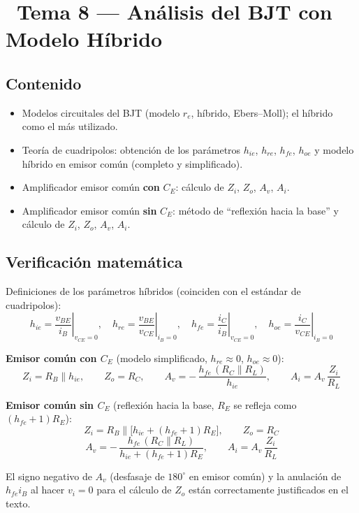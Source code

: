 \documentclass[11pt,a4paper]{article}
\newcommand{\iconotexto}[2]{\textcolor{cyanNeon}{\faIcon{#1}}~#2}
\begin{document}
\section{\iconotexto{project-diagram}{Tema 8 --- Análisis del BJT con Modelo Híbrido}}

\subsection{Contenido}
\begin{itemize}[leftmargin=1.4em]
  \item Modelos circuitales del BJT (modelo $r_e$, híbrido, Ebers--Moll); el híbrido como el más utilizado.
  \item Teoría de cuadripolos: obtención de los parámetros $h_{ie}$, $h_{re}$, $h_{fe}$, $h_{oe}$ y modelo híbrido en emisor común (completo y simplificado).
  \item Amplificador emisor común \textbf{con} $C_E$: cálculo de $Z_i$, $Z_o$, $A_v$, $A_i$.
  \item Amplificador emisor común \textbf{sin} $C_E$: método de ``reflexión hacia la base'' y cálculo de $Z_i$, $Z_o$, $A_v$, $A_i$.
\end{itemize}

\subsection{Verificación matemática}

\begin{tcolorbox}[cajaFortaleza, title={\faIcon{check-circle}~Fórmulas verificadas --- todas correctas}]
Definiciones de los parámetros híbridos (coinciden con el estándar de cuadripolos):
\[
h_{ie} = \left.\frac{v_{BE}}{i_B}\right|_{v_{CE}=0}, \quad
h_{re} = \left.\frac{v_{BE}}{v_{CE}}\right|_{i_B=0}, \quad
h_{fe} = \left.\frac{i_C}{i_B}\right|_{v_{CE}=0}, \quad
h_{oe} = \left.\frac{i_C}{v_{CE}}\right|_{i_B=0}
\]

\textbf{Emisor común con $C_E$} (modelo simplificado, $h_{re} \approx 0$, $h_{oe} \approx 0$):
\[
Z_i = R_B \parallel h_{ie}, \qquad
Z_o = R_C, \qquad
A_v = -\,\frac{h_{fe}\,(R_C \parallel R_L)}{h_{ie}}, \qquad
A_i = A_v\,\frac{Z_i}{R_L}
\]

\textbf{Emisor común sin $C_E$} (reflexión hacia la base, $R_E$ se refleja como $(h_{fe}+1)R_E$):
\[
Z_i = R_B \parallel \bigl[h_{ie} + (h_{fe}+1)R_E\bigr], \qquad
Z_o = R_C
\]
\[
A_v = -\,\frac{h_{fe}\,(R_C \parallel R_L)}{h_{ie} + (h_{fe}+1)R_E}, \qquad
A_i = A_v\,\frac{Z_i}{R_L}
\]

El signo negativo de $A_v$ (desfasaje de $180^{\circ}$ en emisor común) y la anulación de $h_{fe}i_B$ al hacer $v_i = 0$ para el cálculo de $Z_o$ están correctamente justificados en el texto.
\end{tcolorbox}
\end{document}
